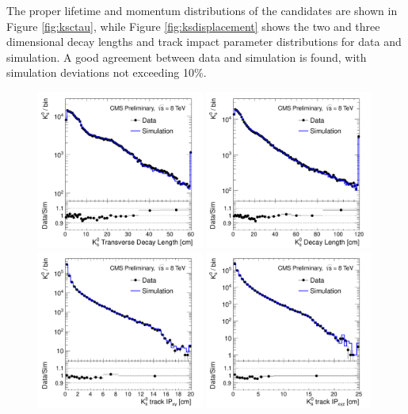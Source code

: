 The proper lifetime and momentum distributions of the \Kshort candidates are
shown in Figure \ref{fig:ksctau}, while
Figure \ref{fig:ksdisplacement} shows the two and three dimensional decay lengths and track impact
 parameter distributions for data and simulation.  
 A good agreement between data and simulation is found, with simulation
 deviations not exceeding 10\%.   

\begin{figure}[htbp]
\centering
\includegraphics[width=0.49\textwidth]{plots/kshort/kslxy.pdf}
\includegraphics[width=0.49\textwidth]{plots/kshort/kslxyz.pdf}\\
\includegraphics[width=0.49\textwidth]{plots/kshort/kstrkip2d.pdf}
\includegraphics[width=0.49\textwidth]{plots/kshort/kstrkip3d.pdf}\\

\end{figure}
